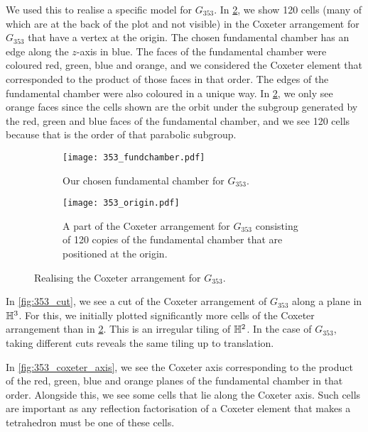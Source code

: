 We used this to realise a specific model for $G_{353}$.
In \cref{fig:353_origin}, we show 120  cells (many of which are at the back of the plot and not visible) in the Coxeter arrangement for $G_{353}$ that have a vertex at the origin.
The chosen fundamental chamber has an edge along the $z$-axis in blue.
The faces of the fundamental chamber were coloured red, green, blue and orange, and we considered the Coxeter element that corresponded to the product of those faces in that order.
The edges of the fundamental chamber were also coloured in a unique way.
In \cref{fig:353_origin}, we only see orange faces since the cells shown are the orbit under the subgroup generated by the red, green and blue faces of the fundamental chamber, and we see 120 cells because that is the order of that parabolic subgroup.

\begin{figure}
	\centering
	\begin{subfigure}[t]{.45\textwidth}
		\centering
		\texttt{[image: 353\_fundchamber.pdf]}
		\caption{Our chosen fundamental chamber for $G_{353}$.}
		\label{fig:353_fund_chamber}
	\end{subfigure}
	\hspace{0.2ex}
	\begin{subfigure}[t]{.45\textwidth}
		\centering
		\texttt{[image: 353\_origin.pdf]}
		\caption{A part of the Coxeter arrangement for $G_{353}$ consisting of 120 copies of the fundamental chamber that are positioned at the origin.}
		\label{fig:353_origin}
	\end{subfigure}%
	\caption{Realising the Coxeter arrangement for $G_{353}$.}
	\label{fig:test}
\end{figure}

In \cref{fig:353_cut}, we see a cut of the Coxeter arrangement of $G_{353}$ along a plane in  $\mathbb{H}^3$.
For this, we initially plotted significantly more cells of the Coxeter arrangement than in  \cref{fig:353_origin}.
This is an irregular tiling of $\mathbb{H}^2$.
In the case of  $G_{353}$, taking different cuts reveals the same tiling up to translation.

In \cref{fig:353_coxeter_axis}, we see the Coxeter axis corresponding to the product of the red, green, blue and orange planes of the fundamental chamber in that order.
Alongside this, we see some cells that lie along the Coxeter axis.
Such cells are important as any reflection factorisation of a Coxeter element that makes a tetrahedron must be one of these cells.

